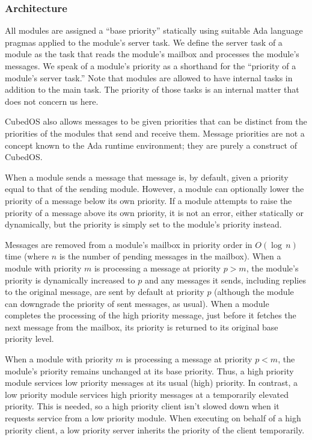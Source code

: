 
\subsubsection{Architecture}

All modules are assigned a ``base priority'' statically using suitable Ada language pragmas
applied to the module's server task. We define the server task of a module as the task that
reads the module's mailbox and processes the module's messages. We speak of a module's priority
as a shorthand for the ``priority of a module's server task.'' Note that modules are allowed to
have internal tasks in addition to the main task. The priority of those tasks is an internal
matter that does not concern us here.

CubedOS also allows messages to be given priorities that can be distinct from the priorities of
the modules that send and receive them. Message priorities are not a concept known to the Ada
runtime environment; they are purely a construct of CubedOS.

When a module sends a message that message is, by default, given a priority equal to that of the
sending module. However, a module can optionally lower the priority of a message below its own
priority. If a module attempts to raise the priority of a message above its own priority, it is
not an error, either statically or dynamically, but the priority is simply set to the module's
priority instead. 

Messages are removed from a module's mailbox in priority order in $O(\log\,n)$ time (where $n$
is the number of pending messages in the mailbox).  When a module with priority $m$ is processing a message at priority $p > m$, the
module's priority is dynamically increased to $p$ and any messages it sends, including replies
to the original message, are sent by default at priority $p$ (although the module can downgrade
the priority of sent messages, as usual). When a module completes the processing of the high
priority message, just before it fetches the next message from the mailbox, its priority is
returned to its original base priority level.

When a module with priority $m$ is processing a message at priority $p < m$, the module's
priority remains unchanged at its base priority. Thus, a high priority module services low
priority messages at its usual (high) priority. In contrast, a low priority module services high
priority messages at a temporarily elevated priority. This  is
needed, so a high priority client isn't slowed down when it requests service from a low priority
module. When executing on behalf of a high priority client, a low priority server inherits the
priority of the client temporarily.

